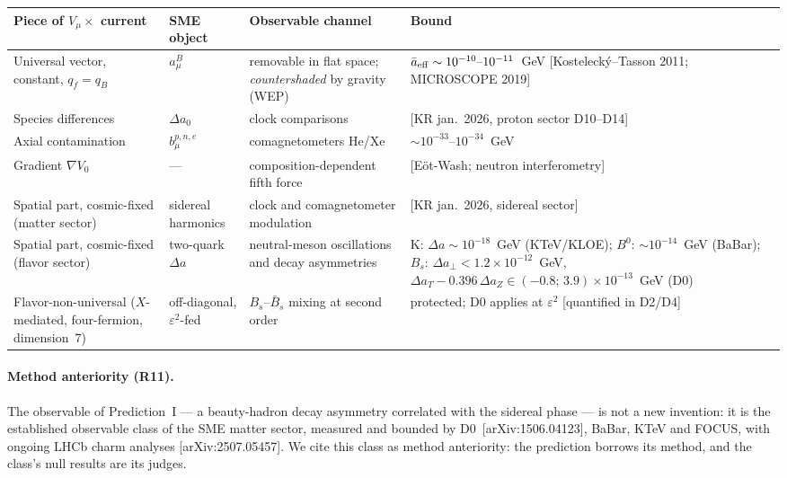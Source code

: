 \begin{center}\small
\begin{tabular}{p{3.8cm}p{2.3cm}p{3.9cm}p{4.0cm}}
\toprule
Piece of $V_\mu\times$ current & SME object & Observable channel & Bound \\
\midrule
Universal vector, constant, $q_f=q_B$ & $a_\mu^{B}$ & removable in flat space;
\emph{countershaded} by gravity (WEP) &
$\bar a_{\rm eff}\sim10^{-10}\text{--}10^{-11}$~GeV
[Kosteleck\'y--Tasson 2011; MICROSCOPE 2019] \\
Species differences & $\Delta a_0$ & clock comparisons &
[KR jan.~2026, proton sector D10--D14] \\
Axial contamination & $b_\mu^{p,n,e}$ & comagnetometers He/Xe &
$\sim10^{-33}\text{--}10^{-34}$~GeV \\
Gradient $\nabla V_0$ & --- & composition-dependent fifth force &
[E\"ot-Wash; neutron interferometry] \\
Spatial part, cosmic-fixed (matter sector) & sidereal harmonics &
clock and comagnetometer modulation & [KR jan.~2026, sidereal sector] \\
Spatial part, cosmic-fixed (flavor sector) & two-quark $\Delta a$ &
neutral-meson oscillations and decay asymmetries &
K: $\Delta a\sim10^{-18}$~GeV (KTeV/KLOE);
$B^0$: $\sim10^{-14}$~GeV (BaBar);
$B_s$: $\Delta a_\perp<1.2\times10^{-12}$~GeV,
$\Delta a_T-0.396\,\Delta a_Z\in(-0.8;\,3.9)\times10^{-13}$~GeV (D0) \\
Flavor-non-universal ($X$-mediated, four-fermion, dimension~7) &
off-diagonal, $\varepsilon^2$-fed & $B_s$--$\bar B_s$ mixing at second order &
protected; D0 applies at $\varepsilon^2$ [quantified in D2/D4] \\
\bottomrule
\end{tabular}
\end{center}

\paragraph{Method anteriority (R11).}
The observable of Prediction~I --- a beauty-hadron decay asymmetry correlated
with the sidereal phase --- is not a new invention: it is the established
observable class of the SME matter sector, measured and bounded by
D0~[arXiv:1506.04123], BaBar, KTeV and FOCUS, with ongoing LHCb charm analyses
[arXiv:2507.05457]. We cite this class as method anteriority: the prediction
borrows its method, and the class's null results are its judges.

